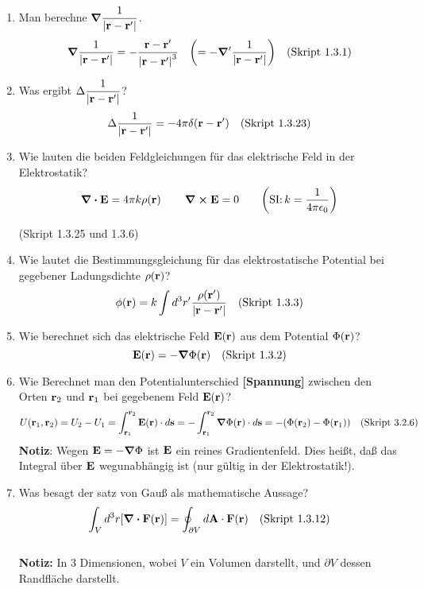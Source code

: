 \begin{enumerate}
  \item Man berechne $\displaystyle \grad\frac{1}{\abs{\vb{r}-\vb{r}'}}$.
        $$\displaystyle \grad\frac{1}{\abs{\vb{r}-\vb{r}'}}=
         -\frac{\vb r -\vb r'}{\abs{\vb r - \vb r'}^3}\quad
         \qty(=-\grad'\frac{1}{\abs{\vb{r}-\vb{r}'}})\quad\text{(Skript 1.3.1)}$$ 

  \item Was ergibt $\displaystyle \Delta\frac{1}{\abs{\vb{r}-\vb{r}'}}$?
        $$\displaystyle \Delta \frac{1}{\abs{\vb{r}-\vb{r}'}} = -4\pi \delta(\vb r-\vb r')
        \quad\text{(Skript 1.3.23)}$$
    
  \item Wie lauten die beiden Feldgleichungen für das 
        elektrische Feld in der Elektrostatik?
        $$\displaystyle \div \vb E=4\pi k\rho(\vb r)\,\qquad\curl\vb E=0
         \qquad\qty(\text{SI:}\,k=\frac{1}{4\pi\epsilon_0})$$
        \begin{center}
          (Skript 1.3.25 und 1.3.6)
        \end{center}
  
  \item Wie lautet die Bestimmungsgleichung für das elektrostatische 
        Potential bei gegebener Ladungsdichte $\rho(\vb r)$?
        $$\phi(\vb r)=k\int d^3r'\frac{\rho(\vb r')}{\abs{\vb{r}-\vb{r}'}}
        \quad\text{(Skript 1.3.3)}$$

  \item Wie berechnet sich das elektrische Feld $\vb E (\vb r)$ aus dem
        Potential $\Phi(\vb r)$?
        $$\displaystyle \vb E(\vb r) = - \grad \Phi (\vb r)
        \quad\text{(Skript 1.3.2)}$$

  \item Wie Berechnet man den Potentialunterschied \textbf{[Spannung]}
        zwischen den Orten 
        $\vb r_2$ und $\vb r_1$ bei gegebenem Feld $\vb E(\vb r)$?
        $$\displaystyle U(\vb r_1, \vb r_2)=U_2-U_1
         =\int_{\vb r_1}^{\vb r_2} \vb E(\vb r)\cdot d\vb s
         =-\int_{\vb r_1}^{\vb r_2} \vb \grad \Phi (\vb r)\cdot d\vb s
         =-\qty(\Phi(\vb r_2)-\Phi(\vb r_1))
         \quad\text{(Skript 3.2.6)}$$
        \textbf{Notiz}: Wegen $\vb E=-\grad\Phi$ ist $\vb E$ ein reines
        Gradientenfeld. Dies heißt, daß das Integral über $\vb E$
        wegunabhängig ist (nur gültig in der Elektrostatik!).

  \item Was besagt der satz von Gauß als mathematische Aussage?
        $$\displaystyle \int_V d^3r \qty[\div \vb F(\vb r)]=
         \oint_{\partial V}d\vb A\cdot \vb F(\vb r)
         \quad\text{(Skript 1.3.12)}$$\\
        \textbf{Notiz:} In 3 Dimensionen, wobei $V$ ein Volumen darstellt,
        und $\partial V$ dessen Randfläche darstellt.


\end{enumerate}
